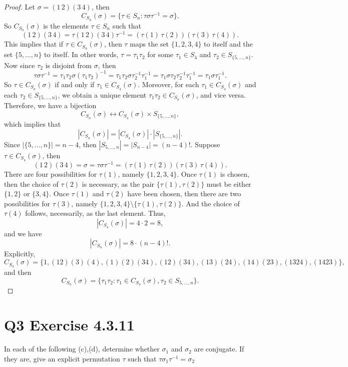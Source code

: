 \documentclass[12pt]{article}
\newenvironment{problem}
    {\begin{lrbox}{\mybox}\begin{minipage}{0.98\textwidth}}
    {\end{minipage}\end{lrbox}\framebox[\textwidth]{\usebox{\mybox}}}
\newcommand{\<}{\left\langle} %
\renewcommand{\>}{\right\rangle} %
\begin{document}
\begin{proof}
    Let $\sigma = (1\,2)(3\,4)$, then
    \[C_{S_n}(\sigma) = \{\tau \in S_n : \tau\sigma\tau^{-1} = \sigma\}.\]
    So $C_{S_n}(\sigma)$ is the elements $\tau \in S_n$ such that
    \[(1\,2)(3\,4) = \tau(1\,2)(3\,4)\tau^{-1} = (\tau(1)\,\tau(2))(\tau(3)\,\tau(4)).\]
    This implies that if $\tau \in C_{S_n}(\sigma)$, then $\tau$ maps the set $\{1, 2, 3, 4\}$ to itself and the set $\{5, \dots, n\}$ to itself. In other words, $\tau = \tau_1 \tau_2$ for some $\tau_1 \in S_4$ and $\tau_2 \in S_{\{5, \dots, n\}}$. Now since $\tau_2$ is disjoint from $\sigma$, then
    \[\tau\sigma\tau^{-1} = \tau_1\tau_2\sigma(\tau_1\tau_2)^{-1} = \tau_1\tau_2\sigma\tau_2^{-1}\tau_1^{-1} = \tau_1\sigma\tau_2\tau_2^{-1}\tau_1^{-1} = \tau_1\sigma\tau_1^{-1}.\]
    So $\tau \in C_{S_n}(\sigma)$ if and only if $\tau_1 \in C_{S_4}(\sigma)$. Moreover, for each $\tau_1 \in C_{S_4}(\sigma)$ and each $\tau_2 \in S_{\{5, \dots, n\}}$, we obtain a unique element $\tau_1 \tau_2 \in C_{S_n}(\sigma)$, and vice versa. Therefore, we have a bijection
    \[C_{S_n}(\sigma) \leftrightarrow C_{S_4}(\sigma) \times S_{\{5, \dots, n\}},\]
    which implies that
    \[|C_{S_n}(\sigma)| = |C_{S_4}(\sigma)| \cdot |S_{\{5, \dots, n\}}|.\]
    Since $|\{5,\dots,n\}| = n-4$, then $|S_{5,\dots,n}| = |S_{n-4}| = (n-4)!$. Suppose $\tau \in C_{S_4}(\sigma)$, then
    \[(1\,2)(3\,4) = \sigma = \tau\sigma\tau^{-1} = (\tau(1)\,\tau(2))(\tau(3)\,\tau(4)).\]
    There are four possibilities for $\tau(1)$, namely $\{1, 2, 3, 4\}$. Once $\tau(1)$ is chosen, then the choice of $\tau(2)$ is necessary, as the pair $\{\tau(1), \tau(2)\}$ must be either $\{1, 2\}$ or $\{3, 4\}$. Once $\tau(1)$ and $\tau(2)$ have been chosen, then there are two possibilities for $\tau(3)$, namely $\{1, 2, 3, 4\} \setminus \{\tau(1), \tau(2)\}$. And the choice of $\tau(4)$ follows, necessarily, as the last element. Thus,
    \[|C_{S_4}(\sigma)| = 4 \cdot 2 = 8,\]
    and we have
    \[|C_{S_n}(\sigma)| = 8 \cdot (n-4)!.\]
    Explicitly,
    \[C_{S_4}(\sigma) = \{1,(12)(3)(4),(1)(2)(34),(12)(34),(13)(24),(14)(23),(1324),(1423)\},\]
    and then
    \[C_{S_n}(\sigma) = \{\tau_1\tau_2 : \tau_1\in C_{S_4}(\sigma), \tau_2 \in S_{5,\dots,n}\}.\]
    
\end{proof}

\newpage
\section*{Q3 Exercise 4.3.11}
\begin{problem}
    In each of the following (c),(d), determine whether $\sigma_1$ and $\sigma_2$ are conjugate. If they are, give an explicit permutation $\tau$ such that $\tau\sigma_1\tau^{-1} = \sigma_2$
\end{problem}
\end{document}
